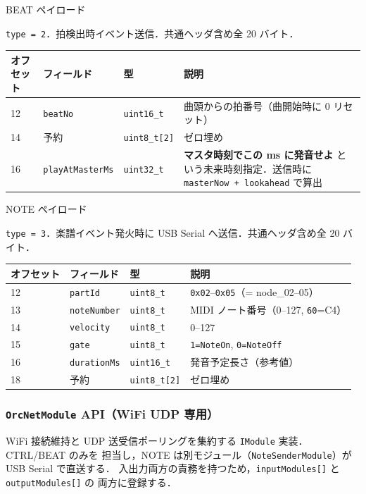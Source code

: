 \documentclass[lualatex,book,paper=a4paper,jafontsize=11.5pt,jafontscale=1.05]{jlreq}
\begin{document}
\begin{apibox}{BEAT ペイロード}
{\raggedright \texttt{type = 2}．拍検出時イベント送信．共通ヘッダ含め全 20 バイト．\par}\medskip
\begin{tabular}{l l l p{}}
\textbf{オフセット} & \textbf{フィールド} & \textbf{型} & \textbf{説明} \\
\midrule
12 & \texttt{beatNo}         & \texttt{uint16\_t}   & 曲頭からの拍番号（曲開始時に 0 リセット） \\
14 & 予約                     & \texttt{uint8\_t[2]} & ゼロ埋め \\
16 & \texttt{playAtMasterMs} & \texttt{uint32\_t}   & \textbf{マスタ時刻でこの ms に発音せよ} という未来時刻指定．送信時に \texttt{masterNow + lookahead} で算出 \\
\end{tabular}
\end{apibox}

\begin{apibox}{NOTE ペイロード}
{\raggedright \texttt{type = 3}．楽譜イベント発火時に USB Serial へ送信．共通ヘッダ含め全 20 バイト．\par}\medskip
\begin{tabular}{l l l p{}}
\textbf{オフセット} & \textbf{フィールド} & \textbf{型} & \textbf{説明} \\
\midrule
12 & \texttt{partId}      & \texttt{uint8\_t}    & \texttt{0x02}--\texttt{0x05}（= node\_02--05） \\
13 & \texttt{noteNumber}  & \texttt{uint8\_t}    & MIDI ノート番号（0--127, \texttt{60}=C4） \\
14 & \texttt{velocity}    & \texttt{uint8\_t}    & 0--127 \\
15 & \texttt{gate}        & \texttt{uint8\_t}    & \texttt{1=NoteOn}, \texttt{0=NoteOff} \\
16 & \texttt{durationMs}  & \texttt{uint16\_t}   & 発音予定長さ（参考値） \\
18 & 予約                  & \texttt{uint8\_t[2]} & ゼロ埋め \\
\end{tabular}
\end{apibox}

\subsubsection{\texttt{OrcNetModule} API（WiFi UDP 専用）}

WiFi 接続維持と UDP 送受信ポーリングを集約する \texttt{IModule} 実装．CTRL/BEAT のみを
担当し，NOTE は別モジュール（\texttt{NoteSenderModule}）が USB Serial で直送する．
入出力両方の責務を持つため，\texttt{inputModules[]} と \texttt{outputModules[]} の
両方に登録する．
\end{document}
